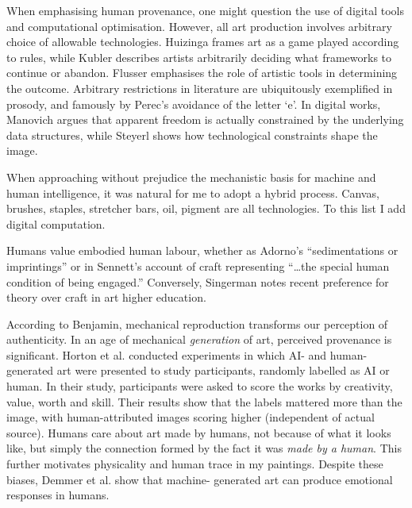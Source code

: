 \documentclass[12pt]{article}
\begin{document}
When emphasising human provenance, one might question the use of
digital tools and computational optimisation. However, all art
production involves arbitrary choice of allowable
technologies. Huizinga frames art as a game played according to
rules,\autocite{huizinga1938homo} while Kubler describes artists
arbitrarily deciding what frameworks to continue or
abandon.\autocite{kubler1962shape} Flusser emphasises the role of artistic
tools in determining the outcome.\autocite{flusser2000towards} Arbitrary
restrictions in literature are ubiquitously exemplified in prosody,
and famously by Perec's avoidance of the letter
`e'.\autocite{perec1969disparition} In digital works, Manovich argues that apparent freedom is actually constrained by the underlying data structures,\autocite{manovich2001language} while Steyerl shows how technological constraints shape the image.\autocite{steyerl2009poorimage}

When approaching without prejudice the mechanistic basis for machine
and human intelligence, it was natural for me to adopt a hybrid
process. Canvas, brushes, staples, stretcher bars, oil, pigment are
all technologies. To this list I add digital computation.

Humans value embodied human labour, whether as Adorno's
``sedimentations or imprintings''\autocite[p.~5]{adorno1970aesthetic} or
in Sennett's account of craft representing ``\dots the special human
condition of being engaged.''\autocite[p.~20]{sennett2008craftsman}
Conversely, Singerman notes recent preference for theory over craft
in art higher education.\autocite[pp.~23--27]{singerman1999artist}

According to Benjamin, mechanical reproduction transforms our
perception of authenticity.\autocite{benjamin1969art} In an age of
mechanical \emph{generation} of art, perceived provenance is
significant. Horton et al. conducted experiments in which AI- and human-
generated art were presented to study participants, randomly labelled
as AI or human.\autocite{horton2023bias} In their study, participants were
asked to score the works by creativity, value, worth and skill. Their
results show that the labels mattered more than the image, with
human-attributed images scoring higher (independent of actual source).
Humans care about art made by humans, not because of what it looks
like, but simply the connection formed by the fact it was \emph{made
  by a human}. This further motivates physicality and human trace in
my paintings. Despite these biases, Demmer et al. show that machine-
generated art can produce emotional responses in
humans.\autocite{demmer2023does}
\end{document}
